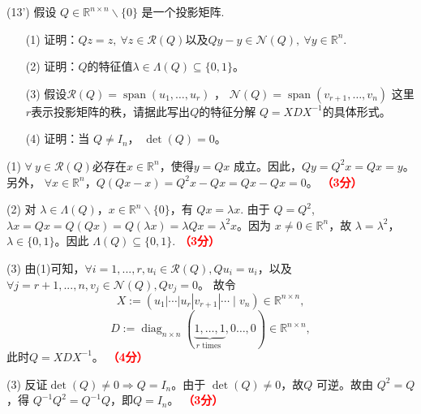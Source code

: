 \documentclass[12pt,a4paper,openany,twoside]{ctexbook}
\begin{document}
\begin{exercise}(13')
	假设 $Q \in \mathbb{R}^{n \times n} \backslash\{0\}$ 是一个投影矩阵.\\
	\begin{itemize}
		\item [(1)] 证明：$Q z=z, \ \forall z \in \mathcal{R}(Q)$以及$Q y-y \in \mathcal{N}(Q), \ \forall y \in \mathbb{R}^n$.
		\item [(2)] 证明：$Q$的特征值$\lambda \in \Lambda(Q) \subseteq\{0,1\}$。
		\item [(3)]  假设$\mathcal{R}(Q)=\operatorname{span}\left(u_1, \ldots, u_r\right)$ ， $\mathcal{N}(Q)=\operatorname{span}\left(v_{r+1}, \ldots, v_n\right)$ 这里$r$表示投影矩阵的秩，请据此写出$Q$的特征分解 $Q=X D X^{-1}$的具体形式。
		\item [(4)] 证明：当 $Q \neq I_n$， $\operatorname{det}(Q)=0$。
	\end{itemize}
	
\end{exercise}
\begin{Solution}
(1)
$\forall \ y \in \mathcal{R}(Q)$必存在$x \in \mathbb{R}^n$，使得$y=Q x$ 成立。因此，$Q y=Q^2 x=Q x=y$。另外，
$\forall x \in \mathbb{R}^n$，$Q(Q x-x)=Q^2 x-Q x=Q x-Q x=0$。
\hfill \textcolor{red}{\textbf{（3分）}}

(2)
对 $\lambda \in \Lambda(Q)$，$x \in \mathbb{R}^n \backslash\{0\}$，有 $Q x=\lambda x$. 由于 $Q=Q^2$,  $\lambda x=Q x=Q(Q x)=Q(\lambda x)=\lambda Q x=\lambda^2 x$。因为 $x \neq 0 \in \mathbb{R}^n$，故 $\lambda=\lambda^2$，$\lambda \in\{0, 1\}$。因此 $\Lambda(Q) \subseteq\{0,1\}$.	\hfill \textcolor{red}{\textbf{（3分）}}

(3)
由(1)可知，$\forall i = 1,...,r, u_i\in \mathcal{R}(Q), Q u_i=u_i$，以及$\forall j = r+1,...,n,v_j\in \mathcal{N}(Q),Q v_j=0$。
故令 $$X:=\left(u_1|\cdots| u_r\left|v_{r+1}\right| \cdots \mid v_n\right) \in \mathbb{R}^{n \times n},$$ $$D:=\operatorname{diag}_{n \times n}(\underbrace{1, \ldots, 1}_{r \text { times }}, 0 \ldots, 0) \in \mathbb{R}^{n \times n},$$
此时$Q=X D X^{-1}$。
\hfill \textcolor{red}{\textbf{（4分）}}

(3) 反证$\operatorname{det}(Q) \neq 0 \Longrightarrow Q=I_n$。由于 $\operatorname{det}(Q) \neq 0$，故$Q$ 可逆。故由 $Q^2=Q$，得 $Q^{-1} Q^2=Q^{-1} Q$，即$Q=I_n$。 \hfill \textcolor{red}{\textbf{（3分）}}
	
\end{Solution}
\end{document}
